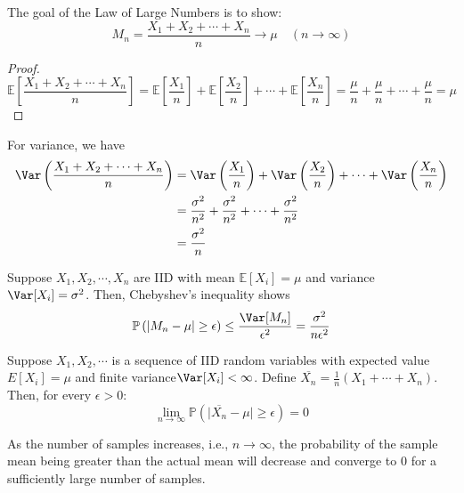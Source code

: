 The goal of the Law of Large Numbers is to show:
\[
    M_n = \dfrac{X_1 + X_2 + \cdots + X_n}{n} \longrightarrow \mu \quad (n \to \infty)
\]

\begin{proof}
    \[
        \mathbb{E}[\dfrac{X_1 + X_2 + \cdots + X_n}{n}] = \mathbb{E}[\dfrac{X_1}{n}] + \mathbb{E}[\dfrac{X_2}{n}] + \cdots + \mathbb{E}[\dfrac{X_n}{n}] = \dfrac{\mu}{n} + \dfrac{\mu}{n} + \cdots + \dfrac{\mu}{n} = \mu 
    \]
\end{proof}

For variance, we have 
\[
        \begin{aligned}
            \Var\left(\dfrac{X_1 + X_2 + \cdots + X_n}{n}\right) &= \Var\left(\dfrac{X_1}{n}\right) + \Var\left(\dfrac{X_2}{n}\right) + \cdots + \Var\left(\dfrac{X_n}{n}\right) \\
            &= \dfrac{\sigma^2}{n^2} + \dfrac{\sigma^2}{n^2} + \cdots + \dfrac{\sigma^2}{n^2} \\
            &= \dfrac{\sigma^2}{n}
        \end{aligned}
    \]


Suppose \(X_1, X_2, \cdots, X_n\) are IID with mean \(\mathbb{E}[X_i] = \mu\) and variance \(\Var[X_i] = \sigma^2\). Then, Chebyshev's inequality shows 
\[
        \mathbb{P}\left(\vert M_n - \mu \vert \geq \epsilon \right) \leq \dfrac{\Var[M_n]}{\epsilon^2} = \dfrac{\sigma^2}{n\epsilon^2}
\]

\newpage
\begin{theorem}
    Suppose \(X_1, X_2, \cdots\) is a sequence of IID random variables with expected value \(E[X_i] = \mu\) and finite variance\(\Var[X_i] < \infty\). Define \(\overline{X_n} = \frac{1}{n}(X_1 + \cdots + X_n)\). Then, for every \(\epsilon > 0\):
    \[
        \lim_{n \to \infty} \mathbb{P}(\vert \overline{X_n} - \mu \vert \geq \epsilon) = 0
    \]

    \begin{explanation}
        As the number of samples increases, i.e., \(n \rightarrow \infty\), the probability of the sample mean being greater than the actual mean will decrease and converge to 0 for a sufficiently large number of samples.
    \end{explanation}
\end{theorem}

